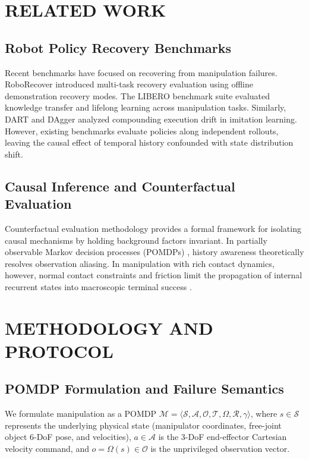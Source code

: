 \documentclass[letterpaper, 10 pt, conference]{ieeeconf}
\begin{document}
\section{RELATED WORK}
\label{sec:related_work}

\subsection{Robot Policy Recovery Benchmarks}
Recent benchmarks have focused on recovering from manipulation failures. RoboRecover \cite{liu2024roborecover} introduced multi-task recovery evaluation using offline demonstration recovery modes. The LIBERO benchmark suite \cite{liu2023libero} evaluated knowledge transfer and lifelong learning across manipulation tasks. Similarly, DART \cite{laskey2017dart} and DAgger \cite{ross2011reduction} analyzed compounding execution drift in imitation learning. However, existing benchmarks evaluate policies along independent rollouts, leaving the causal effect of temporal history confounded with state distribution shift.

\subsection{Causal Inference and Counterfactual Evaluation}
Counterfactual evaluation methodology \cite{pearl2009causality} provides a formal framework for isolating causal mechanisms by holding background factors invariant. In partially observable Markov decision processes (POMDPs) \cite{kaelbling1998planning}, history awareness theoretically resolves observation aliasing. In manipulation with rich contact dynamics, however, normal contact constraints and friction limit the propagation of internal recurrent states into macroscopic terminal success \cite{mandlekar2021what, chi2023diffusionpolicy}.

\section{METHODOLOGY AND PROTOCOL}
\label{sec:methodology}

\subsection{POMDP Formulation and Failure Semantics}
We formulate manipulation as a POMDP $\mathcal{M} = \langle \mathcal{S}, \mathcal{A}, \mathcal{O}, \mathcal{T}, \Omega, \mathcal{R}, \gamma \rangle$, where $s \in \mathcal{S}$ represents the underlying physical state (manipulator coordinates, free-joint object 6-DoF pose, and velocities), $a \in \mathcal{A}$ is the 3-DoF end-effector Cartesian velocity command, and $o = \Omega(s) \in \mathcal{O}$ is the unprivileged observation vector. 
\end{document}
